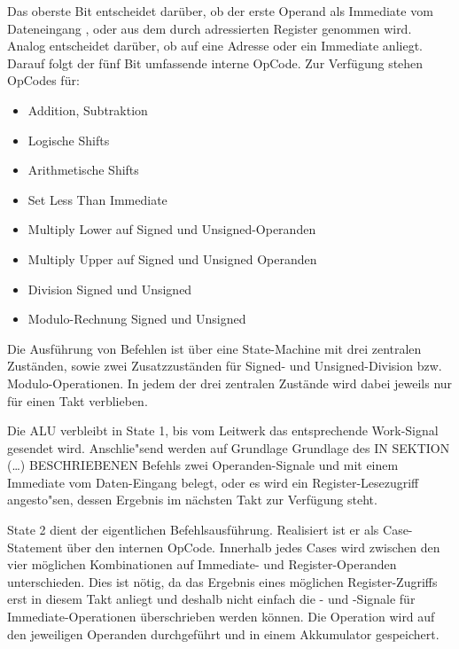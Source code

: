Das oberste Bit  entscheidet dar\"uber, ob der erste Operand als Immediate vom Dateneingang , oder aus dem durch  adressierten Register genommen wird.
Analog entscheidet  dar\"uber, ob auf  eine Adresse oder ein Immediate anliegt.
Darauf folgt der f\"unf Bit umfassende interne OpCode. Zur Verf\"ugung stehen OpCodes f\"ur:

\begin{itemize}
\item Addition, Subtraktion
\item Logische Shifts
\item Arithmetische Shifts
\item Set Less Than Immediate
\item Multiply Lower auf Signed und Unsigned-Operanden
\item Multiply Upper auf Signed und Unsigned Operanden
\item Division Signed und Unsigned
\item Modulo-Rechnung Signed und Unsigned
\end{itemize}




Die Ausf\"uhrung von Befehlen ist \"uber eine State-Machine mit drei zentralen Zust\"anden, sowie zwei Zusatzzust\"anden f\"ur Signed- und Unsigned-Division bzw. Modulo-Operationen. In jedem der drei zentralen Zust\"ande wird dabei jeweils nur f\"ur einen Takt verblieben.


Die ALU verbleibt in State 1, bis vom Leitwerk das entsprechende Work-Signal gesendet wird.
Anschlie"send werden auf Grundlage Grundlage des IN SEKTION (…) BESCHRIEBENEN Befehls zwei Operanden-Signale  und  mit einem Immediate vom Daten-Eingang belegt, oder es wird ein Register-Lesezugriff angesto"sen, dessen Ergebnis im nächsten Takt zur Verf\"ugung steht.


State 2 dient der eigentlichen Befehlsausf\"uhrung. Realisiert ist er als Case-Statement \"uber den internen OpCode. Innerhalb jedes Cases wird zwischen den vier m\"oglichen Kombinationen auf Immediate- und Register-Operanden unterschieden.
Dies ist n\"otig, da das Ergebnis eines m\"oglichen Register-Zugriffs erst in diesem Takt anliegt und deshalb nicht einfach die - und -Signale f\"ur Immediate-Operationen \"uberschrieben werden k\"onnen.
Die Operation wird auf den jeweiligen Operanden durchgef\"uhrt und in einem Akkumulator gespeichert.\vspace{10pt}


